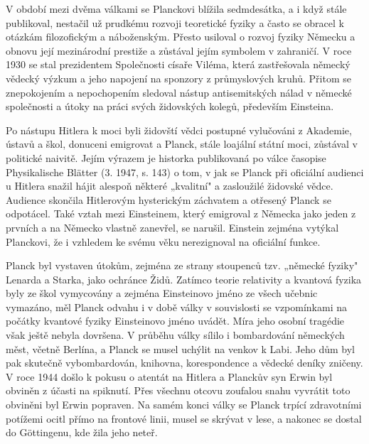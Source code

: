         V období mezi dvěma válkami se Planckovi blížila sedmdesátka, a i když stále publikoval,
        nestačil už prudkému rozvoji teoretické fyziky a často se obracel k otázkám filozofickým a
        náboženským. Přesto usiloval o rozvoj fyziky Německu a obnovu její mezinárodní prestiže a
        zůstával jejím symbolem v zahraničí. V roce 1930 se stal prezidentem Společnosti císaře
        Viléma, která zastřešovala německý vědecký výzkum a jeho napojení na sponzory z průmyslových
        kruhů. Přitom se znepokojením a nepochopením sledoval nástup antisemitských nálad v německé
        společnosti a útoky na práci svých židovských kolegů, především Einsteina. 

        Po nástupu Hitlera k moci byli židovští vědci postupné vylučováni z Akademie, ústavů a škol,
        donuceni emigrovat a Planck, stále loajální státní moci, zůstával v politické naivitě. Jejím
        výrazem je historka publikovaná po válce časopise Physikalische Blätter (3. 1947, s. 143) o
        tom, v jak se Planck při oficiální audienci u Hitlera snažil hájit alespoň některé
        „kvalitní" a zasloužilé židovské vědce. Audience skončila Hitlerovým hysterickým záchvatem a
        otřesený Planck se odpotácel. Také vztah mezi Einsteinem, který emigroval z Německa jako
        jeden z prvních a na Německo vlastně zanevřel, se narušil. Einstein zejména vytýkal
        Planckovi, že i vzhledem ke svému věku nerezignoval na oficiální funkce.

        Planck byl vystaven útokům, zejména ze strany stoupenců tzv. „německé fyziky" Lenarda a
        Starka, jako ochránce Židů. Zatímco teorie relativity a kvantová fyzika byly ze škol
        vymycovány a zejména Einsteinovo jméno ze všech učebnic vymazáno, měl Planck odvahu i v době
        války v souvislosti se vzpomínkami na počátky kvantové fyziky Einsteinovo jméno uvádět. Míra
        jeho osobní tragédie však ještě nebyla dovršena. V průběhu války sílilo i bombardování
        německých měst, včetně Berlína, a Planck se musel uchýlit na venkov k Labi. Jeho dům byl pak
        skutečně vybombardován, knihovna, korespondence a vědecké deníky zničeny. V roce 1944 došlo
        k pokusu o atentát na Hitlera a Planckův syn Erwin byl obviněn z účasti na spiknutí. Přes
        všechnu otcovu zoufalou snahu vyvrátit toto obviněni byl Erwin popraven. Na samém konci
        války se Planck trpící zdravotními potížemi ocitl přímo na frontové linii, musel se skrývat
        v lese, a nakonec se dostal do Göttingenu, kde žila jeho neteř. 

